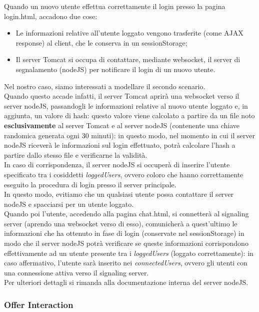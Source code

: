 Quando un nuovo utente effettua correttamente il login presso la pagina login.html, accadono due cose:
\begin{itemize}
\item Le informazioni relative all'utente loggato vengono trasferite (come AJAX response) al client, che le conserva in un sessionStorage;
\item Il server Tomcat si occupa di contattare, mediante websocket, il server di segnalamento (nodeJS) per notificare il login di un nuovo utente.
\end{itemize}

Nel nostro caso, siamo interessati a modellare il secondo scenario.\\
Quando questo accade infatti, il server Tomcat aprirà una websocket verso il server nodeJS, passandogli le informazioni relative al nuovo utente loggato e, in aggiunta, un valore di hash: questo valore viene calcolato a partire da un file noto \textbf{esclusivamente} al server Tomcat e al server nodeJS (contenente una chiave randomica generata ogni 30 minuti): in questo modo, nel momento in cui il server nodeJS riceverà le informazioni sul login effettuato, potrà calcolare l'hash a partire dallo stesso file e verificarne la validità.\\
In caso di corrispondenza, il server nodeJS si occuperà di inserire l'utente specificato tra i cosiddetti \textit{loggedUsers}, ovvero coloro che hanno correttamente eseguito la procedura di login presso il server principale.\\
In questo modo, evitiamo che un qualsiasi utente possa contattare il server nodeJS e spacciarsi per un utente loggato.\\
Quando poi l'utente, accedendo alla pagina chat.html, si connetterà al signaling server (aprendo una websocket verso di esso), comunicherà a quest'ultimo le informazioni che ha ottenuto in fase di login (conservate nel sessionStorage) in modo che il server nodeJS potrà verificare se queste informazioni corrispondono effettivamente ad un utente presente tra i \textit{loggedUsers} (loggato correttamente): in caso affermativo, l'utente sarà inserito nei \textit{connectedUsers}, ovvero gli utenti con una connessione attiva verso il signaling server.\\
Per ulteriori dettagli si rimanda alla documentazione interna del server nodeJS.\\



\subsubsection{Offer Interaction}

